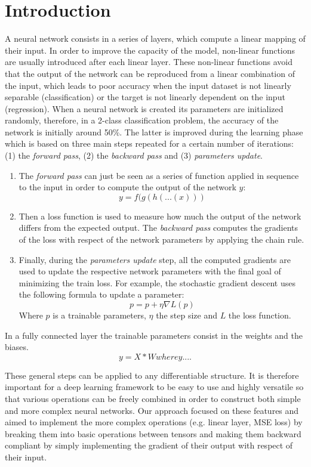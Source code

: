 \documentclass[10pt,conference,compsocconf]{IEEEtran}
\begin{document}
\section{Introduction}
A neural network consists in a series of layers, which compute a linear mapping of their input. In order to improve the capacity of the model, non-linear functions are usually introduced after each linear layer. These non-linear functions avoid that the output of the network can be reproduced from a linear combination of the input, which leads to poor accuracy when the input dataset is not linearly separable (classification) or the target is not linearly dependent on the input (regression).
When a neural network is created its parameters are initialized randomly, therefore, in a 2-class classification problem, the accuracy of the network is initially around 50\%. The latter is improved during the learning phase which is based on three main steps repeated for a certain number of iterations: (1) the \textit{forward pass}, (2) the \textit{backward pass} and (3) \textit{parameters update}. 
\begin{enumerate}
    \item The \textit{forward pass} can just be seen as a series of function applied in sequence to the input in order to compute the output of the network $y$:
    \[y = f(g(h(...(x)))\]
    \item Then a loss function is used to measure how much the output of the network differs from the expected output. The \textit{backward pass} computes the gradients of the loss with respect of the network parameters by applying the chain rule.
    \item Finally, during the \textit{parameters update} step, all the computed gradients are used to update the respective network parameters with the final goal of minimizing the train loss. For example, the stochastic gradient descent uses the following formula to update a parameter: 
    \[p = p + \eta\nabla L(p)\]
    Where $p$ is a trainable parameters, $\eta$ the step size and $L$ the loss function.
\end{enumerate}
In a fully connected layer the trainable parameters consist in the weights and the biases.
\[y = X*W where y....\]

These general steps can be applied to any differentiable structure. It is therefore important for a deep learning framework to be easy to use and highly versatile so that various operations can be freely combined in order to construct both simple and more complex neural networks. Our approach focused on these features and aimed to implement the more complex operations (e.g. linear layer, MSE loss) by breaking them into basic operations between tensors and making them backward compliant by simply implementing the gradient of their output with respect of their input.
        
\end{document}
